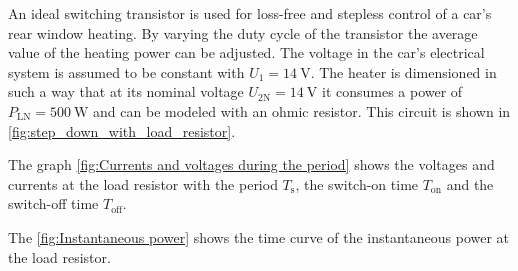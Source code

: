 

An ideal switching transistor is used for loss-free and stepless control of a car's rear window heating.
By varying the duty cycle of the transistor the average value of the heating power can be adjusted. The voltage in the car's electrical system is assumed to be constant with $U_1 = \SI{14}{\volt}$. The heater is dimensioned in such a way
that at its nominal voltage $ U_{\mathrm{2N}} = \SI{14}{\volt}$ it consumes a power of $ P_{\mathrm{LN}} = \SI{500}{\watt}$ and
can be modeled with an ohmic resistor. This circuit is shown in \autoref{fig:step_down_with_load_resistor}.


\begin{solutionblock}
The graph \autoref{fig:Currents and voltages during the period} shows the voltages and currents at the load resistor with the period $T_{\mathrm{s}}$, the switch-on time $T_{\mathrm{on}}$ and the switch-off time $T_{\mathrm{off}}$. 


            
\end{solutionblock}



\begin {solutionblock}
The \autoref{fig:Instantaneous power} shows the time curve of the instantaneous power at the load resistor.



\end{solutionblock}


